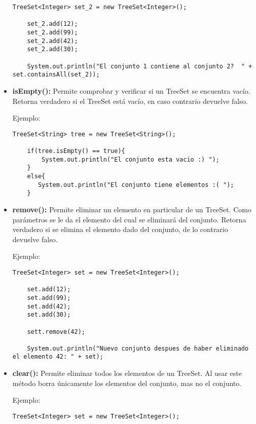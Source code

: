\documentclass[12pt, letterpaper]{article} %
\begin{document}
\begin{itemize}
\begin{lstlisting}[frame=single]
    TreeSet<Integer> set_2 = new TreeSet<Integer>();

    set_2.add(12);
    set_2.add(99);
    set_2.add(42);
    set_2.add(30);

    System.out.println("El conjunto 1 contiene al conjunto 2?  " +  set.containsAll(set_2));
    \end{lstlisting}

    \item \textbf{isEmpty():} Permite comprobar y verificar si un TreeSet se encuentra vacío. Retorna verdadero si el TreeSet está vacío, en caso contrario devuelve falso.
    
    Ejemplo:
    \lstset{language = Java, breaklines=true, basicstyle=\footnotesize}
    \begin{lstlisting}[frame=single]
    TreeSet<String> tree = new TreeSet<String>();

    if(tree.isEmpty() == true){
        System.out.println("El conjunto esta vacio :) ");
    }
    else{
	   System.out.println("El conjunto tiene elementos :( ");
    }
    \end{lstlisting}

    \item \textbf{remove():} Permite eliminar un elemento en particular de un TreeSet. Como parámetros se le da el elemento del cual se eliminará del conjunto. Retorna verdadero si se elimina el elemento dado del conjunto, de lo contrario devuelve falso.
    
    Ejemplo:
    \lstset{language = Java, breaklines=true, basicstyle=\footnotesize}
    \begin{lstlisting}[frame=single]
    TreeSet<Integer> set = new TreeSet<Integer>();

    set.add(12);
    set.add(99);
    set.add(42);
    set.add(30);

    sett.remove(42);

    System.out.println("Nuevo conjunto despues de haber eliminado el elemento 42: " + set);
    \end{lstlisting}

    \item \textbf{clear():} Permite eliminar todos los elementos de un TreeSet. Al usar este método borra únicamente los elementos del conjunto, mas no el conjunto.

    Ejemplo:
    \lstset{language = Java, breaklines=true, basicstyle=\footnotesize}
    \begin{lstlisting}[frame=single]
    TreeSet<Integer> set = new TreeSet<Integer>();


\end{lstlisting}
\end{itemize}
\end{document}
